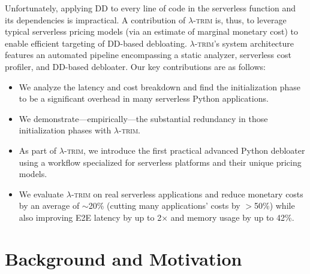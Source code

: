\documentclass[sigplan,nonacm]{acmart}
\newenvironment{vinlist}
{\begin{itemize}[leftmargin=1.5em]
  \setlength{\itemsep}{0pt}
  \setlength{\labelwidth}{0.75em}
\setlength{\parsep}{0pt}
\setlength{\topsep}{0pt}
  \setlength{\partopsep}{0pt}
  }
{\end{itemize}}
\newcommand{\sys}{\textsc{\ensuremath{\lambda}-trim}\xspace}
\begin{document}
Unfortunately, applying DD to every line of code in the serverless function and its dependencies is impractical.
A contribution of \sys is, thus, to leverage typical serverless pricing models (via an estimate of marginal monetary cost) to enable efficient targeting of DD-based debloating.
\sys's system architecture features an automated pipeline encompassing a static analyzer, serverless cost profiler, and DD-based debloater.
Our key contributions are as follows:


































\begin{vinlist}
    \item We analyze the latency and cost breakdown and find the initialization phase to be a significant overhead in many serverless Python applications.
\item We demonstrate---empirically---the substantial redundancy in those initialization phases with \sys.
    \item As part of \sys, we introduce the first practical advanced Python debloater using
    a workflow specialized for serverless platforms and their unique pricing models.
\item We evaluate \sys on real serverless applications and reduce monetary costs by an average of $\sim$20\% (cutting many applications' costs by $>$50\%) while also improving E2E latency by up to 2$\times$ and memory usage by up to 42\%.
\end{vinlist}
\vspace{-6pt}







 
\section{Background and Motivation}\label{sec:measurement-study}
\end{document}
